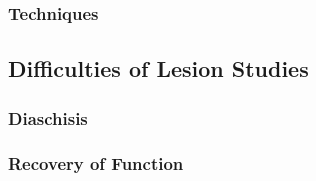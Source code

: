 \subsubsection{Techniques}

\subsection{Difficulties of Lesion Studies}

\subsubsection{Diaschisis}

\subsubsection{Recovery of Function}
